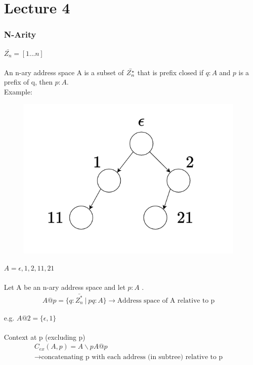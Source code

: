 \chapter{Lecture 4}
\subsection{N-Arity}
$\bar{Z_{n}} = [1...n]$

\subsubsection{}An n-ary address space A is a subset of $\Bar{Z^{*}_{n}}$ that is prefix closed if $q: A$ and $p$ is a prefix of q, then $p: A$.\\

Example:
\begin{figure}[htbp]
    \center
    \includegraphics[scale=0.8]{images/popl-4-1.png}
    \caption{}
\end{figure}

$A = {\epsilon, 1, 2, 11, 21}$
\subsubsection{}
Let A be an n-ary address space and let $p:A$ .
\begin{gather}
    A@p = \{q: \bar{Z_{n}^{*}}\  \vert\  pq: A\}  \xrightarrow{} \text{Address space of A relative to p}
\end{gather}

e.g.
\indent $A@2 = \{\epsilon, 1\}$

\subsubsection{}
Context at p (excluding p)
\begin{gather}
    C_{ex}(A, p) = A\backslash pA@p\\
    \xrightarrow{} \text{concatenating p with each address (in subtree) relative to p}
\end{gather}

